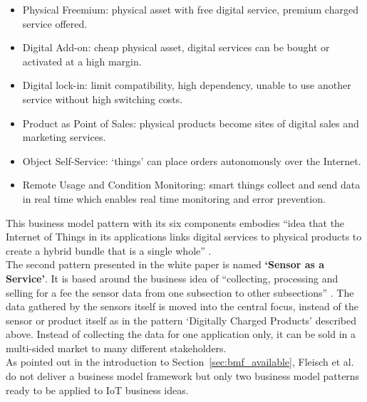 		\begin{itemize}
			\item Physical Freemium: physical asset with free digital service, premium charged service offered.
			\item Digital Add-on: cheap physical asset, digital services can be bought or activated at a high margin.
			\item Digital lock-in: limit compatibility, high dependency, unable to use another service without high switching costs.
			\item Product as Point of Sales: physical products become  sites of digital sales and marketing services.
			\item Object Self-Service: `things' can place orders autonomously over the Internet. 
			\item Remote Usage and Condition Monitoring: smart things collect and send data in real time which enables real time monitoring and error prevention.
		\end{itemize}

		This business model pattern with its six components embodies ``idea that the Internet of Things in its applications links digital services to physical products to create a hybrid bundle that is a single whole'' \cite{fleisch}.\\
		The second pattern presented in the white paper is named \textbf{`Sensor as a Service'}. It is based around the business idea of ``collecting, processing and selling for a fee the sensor data from one subsection to other subsections'' \cite{fleisch}. The data gathered by the sensors itself is moved into the central focus, instead of the sensor or product itself as in the pattern `Digitally Charged Products' described above. Instead of collecting the data for one application only, it can be sold in a multi-sided market to many different stakeholders.\\
		As pointed out in the introduction to Section~\ref{sec:bmf_available}, Fleisch et al. do not deliver a business model framework but only two business model patterns ready to be applied to IoT business ideas.
	\vspace{-1em}
